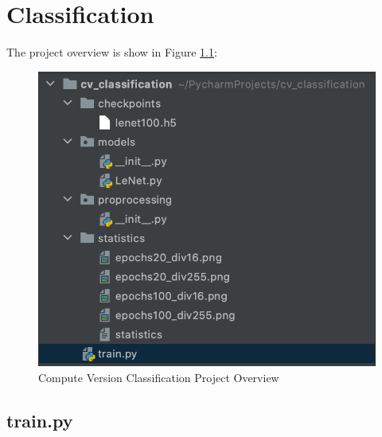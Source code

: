 
\chapter{Classification}

The project overview is show in Figure \ref{fig:cv-classification}:
\begin{figure}[!ht]
  \centering
  \includegraphics[width=\textwidth]{pics/cv-classification}
  \caption[CV Classification]{Compute Version Classification Project Overview}
  \label{fig:cv-classification}
\end{figure}



\section{train.py}

